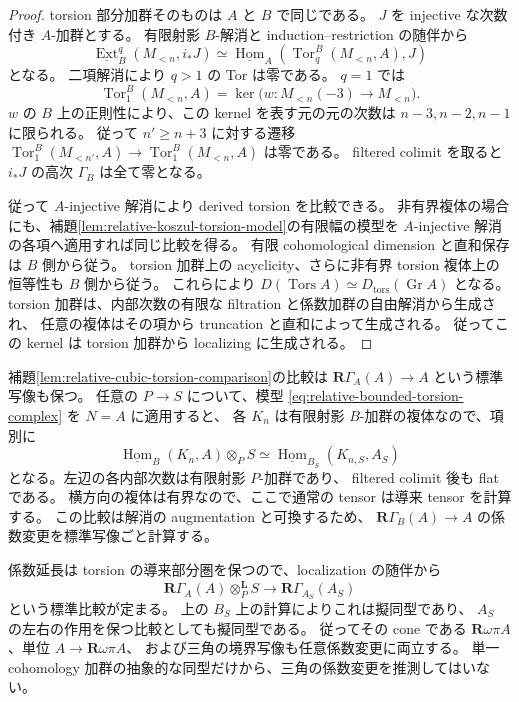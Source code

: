 \begin{proof}
torsion 部分加群そのものは $A$ と $B$ で同じである。
$J$ を injective な次数付き $A$-加群とする。
有限射影 $B$-解消と induction--restriction の随伴から
\[
 \underline{\operatorname{Ext}}^q_B(M_{<n},i_*J)
 \simeq
 \underline{\operatorname{Hom}}_A
       (\operatorname{Tor}^B_q(M_{<n},A),J)
\]
となる。
二項解消により $q>1$ の Tor は零である。
$q=1$ では
\[
 \operatorname{Tor}^B_1(M_{<n},A)
 =\ker\bigl(w:M_{<n}(-3)\to M_{<n}\bigr).
\]
$w$ の $B$ 上の正則性により、この kernel を表す元の元の次数は
$n-3,n-2,n-1$ に限られる。
従って $n'\geq n+3$ に対する遷移
$\operatorname{Tor}^B_1(M_{<n'},A)\to\operatorname{Tor}^B_1(M_{<n},A)$ は零である。
filtered colimit を取ると $i_*J$ の高次 $\Gamma_B$ は全て零となる。

従って $A$-injective 解消により derived torsion を比較できる。
非有界複体の場合にも、補題\ref{lem:relative-koszul-torsion-model}の有限幅の模型を
$A$-injective 解消の各項へ適用すれば同じ比較を得る。
有限 cohomological dimension と直和保存は $B$ 側から従う。
torsion 加群上の acyclicity、さらに非有界 torsion 複体上の恒等性も $B$ 側から従う。
これらにより $D(\operatorname{Tors}A)\simeq D_{\operatorname{tors}}(\operatorname{Gr}A)$ となる。
torsion 加群は、内部次数の有限な filtration と係数加群の自由解消から生成され、
任意の複体はその項から truncation と直和によって生成される。
従ってこの kernel は torsion 加群から localizing に生成される。
\end{proof}

\begin{remark}
\label{rem:relative-cubic-localization-triangle-basechange}
補題\ref{lem:relative-cubic-torsion-comparison}の比較は
$\mathbf R\Gamma_A(A)\to A$ という標準写像も保つ。
任意の $P\to S$ について、模型
\eqref{eq:relative-bounded-torsion-complex} を $N=A$ に適用すると、
各 $K_n$ は有限射影 $B$-加群の複体なので、項別に
\[
 \underline{\operatorname{Hom}}_B(K_n,A)\otimes_PS
 \simeq
 \underline{\operatorname{Hom}}_{B_S}(K_{n,S},A_S)
\]
となる。左辺の各内部次数は有限射影 $P$-加群であり、
filtered colimit 後も flat である。
横方向の複体は有界なので、ここで通常の tensor は導来 tensor を計算する。
この比較は解消の augmentation と可換するため、
$\mathbf R\Gamma_B(A)\to A$ の係数変更を標準写像ごと計算する。

係数延長は torsion の導来部分圏を保つので、localization の随伴から
\[
 \mathbf R\Gamma_A(A)\otimes_P^{\mathbf L}S
 \longrightarrow\mathbf R\Gamma_{A_S}(A_S)
\]
という標準比較が定まる。
上の $B_S$ 上の計算によりこれは擬同型であり、
$A_S$ の左右の作用を保つ比較としても擬同型である。
従ってその cone である $\mathbf R\omega\pi A$、単位 $A\to\mathbf R\omega\pi A$、
および三角の境界写像も任意係数変更に両立する。
単一 cohomology 加群の抽象的な同型だけから、三角の係数変更を推測してはいない。
\end{remark}

